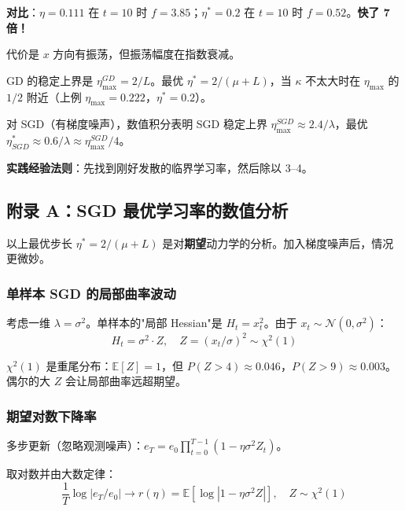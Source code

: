 \documentclass[12pt, a4paper]{ctexart}
\begin{document}
\textbf{对比}：$\eta = 0.111$ 在 $t=10$ 时 $f = 3.85$；$\eta^* = 0.2$ 在 $t=10$ 时 $f = 0.52$。\textbf{快了 7 倍！}

代价是 $x$ 方向有振荡，但振荡幅度在指数衰减。

\begin{insight}[最优学习率大概是能稳定训练的最大学习率的一半再小一点]
GD 的稳定上界是 $\eta_{\max}^{GD} = 2/L$。最优 $\eta^* = 2/(\mu+L)$，当 $\kappa$ 不太大时在 $\eta_{\max}$ 的 $1/2$ 附近（上例 $\eta_{\max}=0.222$，$\eta^*=0.2$）。

对 SGD（有梯度噪声），数值积分表明 SGD 稳定上界 $\eta_{\max}^{SGD} \approx 2.4/\lambda$，最优 $\eta^*_{SGD} \approx 0.6/\lambda \approx \eta_{\max}^{SGD}/4$。

\textbf{实践经验法则}：先找到刚好发散的临界学习率，然后除以 3--4。
\end{insight}

\subsection{附录 A：SGD 最优学习率的数值分析}

以上最优步长 $\eta^* = 2/(\mu+L)$ 是对\textbf{期望}动力学的分析。加入梯度噪声后，情况更微妙。

\subsubsection{单样本 SGD 的局部曲率波动}

考虑一维 $\lambda = \sigma^2$。单样本的"局部 Hessian"是 $H_t = x_t^2$。由于 $x_t \sim \mathcal{N}(0, \sigma^2)$：
\begin{equation}
    H_t = \sigma^2 \cdot Z, \quad Z = (x_t/\sigma)^2 \sim \chi^2(1)
\end{equation}

$\chi^2(1)$ 是重尾分布：$\mathbb{E}[Z] = 1$，但 $P(Z > 4) \approx 0.046$，$P(Z > 9) \approx 0.003$。偶尔的大 $Z$ 会让局部曲率远超期望。

\subsubsection{期望对数下降率}

多步更新（忽略观测噪声）：$e_T = e_0 \prod_{t=0}^{T-1}(1 - \eta\sigma^2 Z_t)$。

取对数并由大数定律：
\begin{equation}
    \frac{1}{T}\log|e_T/e_0| \to r(\eta) = \mathbb{E}[\log|1 - \eta\sigma^2 Z|], \quad Z \sim \chi^2(1)
\end{equation}
\end{document}
